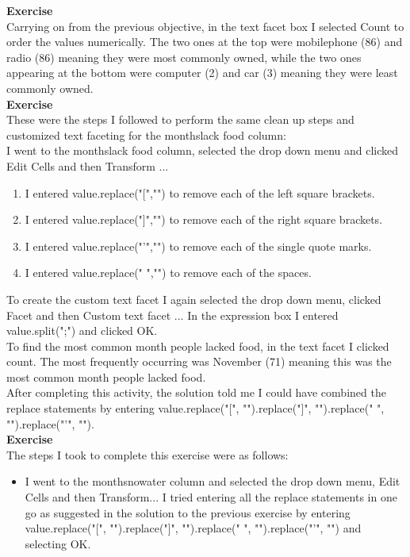 \documentclass{article}
\begin{document}
\begin{FlushLeft}
\textbf{Exercise}\\ 
Carrying on from the previous objective, in the text facet box I selected Count to order the values numerically. The two ones at the top were mobile\textunderscore phone (86) and radio (86) meaning they were most commonly owned, while the two ones appearing at the bottom were computer (2) and car (3) meaning they were least commonly owned.\\
\vspace{5mm}
\textbf{Exercise}\\ 
These were the steps I followed to perform the same clean up steps and customized text faceting for the months\textunderscore lack \textunderscore food column:\\
I went to the months\textunderscore lack \textunderscore food column, selected the drop down menu and clicked Edit Cells and then Transform ...
 \begin{enumerate}
    \item I entered value.replace("[","") to remove each of the left square brackets.
    \item I entered value.replace("]","") to remove each of the right square brackets.
    \item I entered value.replace("'","") to remove each of the single quote marks.
    \item I entered value.replace(" ","") to remove each of the spaces.
    \end{enumerate}
To create the custom text facet I again selected the drop down menu, clicked Facet and then Custom text facet ... In the expression box I entered value.split(";") and clicked OK.\\
To find the most common month people lacked food, in the text facet I clicked count. The most frequently occurring was November (71) meaning this was the most common month people lacked food.\\
After completing this activity, the solution told me I could have combined the replace statements by entering value.replace("[", "").replace("]", "").replace(" ", "").replace("'", "").\\
\vspace{5mm}
\textbf{Exercise}\\ 
The steps I took to complete this exercise were as follows:
\begin{itemize}
    \item I went to the months\textunderscore no\textunderscore water column and selected the drop down menu, Edit Cells and then Transform... I tried entering all the replace statements in one go as suggested in the solution to the previous exercise by entering value.replace("[", "").replace("]", "").replace(" ", "").replace("'", "") and selecting OK.

\end{itemize}
\end{FlushLeft}
\end{document}
